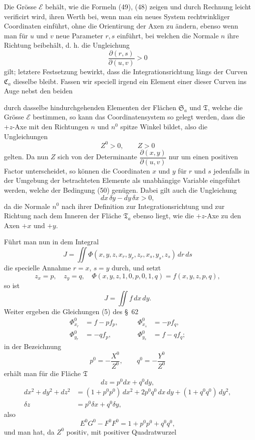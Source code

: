 \documentclass[11pt,a4paper,leqno]{article}
\begin{document}
Die Grösse $\mathcal{E}$ behält, wie die Formeln (49), (48) zeigen und durch
Rechnung leicht verificirt wird, ihren Werth bei, wenn man ein neues System
rechtwinkliger Coordinaten einführt, ohne die Orientirung der Axen zu
ändern, ebenso wenn man für $u$ und $v$ neue Parameter $r,s$ einführt, bei
welchen die Normale $n$ ihre Richtung beibehält, d. h. die Ungleichung
\begin{equation}\tag{50}
\frac{\partial(r,s)}{\partial(u,v)}>0
\end{equation}
gilt; letztere Festsetzung bewirkt, dass die Integrationsrichtung längs der
Curven $\mathfrak{C}_a$ dieselbe bleibt. Fassen wir speciell irgend ein
Element einer dieser Curven ins Auge nebst den beiden

durch dasselbe hindurchgehenden Elementen der Flächen $\mathfrak{S}_a$ und
$\mathfrak{T}$, welche die Grösse $\mathcal{E}$ bestimmen, so kann das
Coordinatensystem so gelegt werden, dass die $+z$-Axe mit den Richtungen $n$
und $n^0$ spitze Winkel bildet, also die Ungleichungen
\[
Z^0>0,\qquad Z>0
\]
gelten. Da nun $Z$ sich von der Determinante
$\dfrac{\partial(x,y)}{\partial(u,v)}$ nur um einen positiven Factor
unterscheidet, so können die Coordinaten $x$ und $y$ für $r$ und $s$
jedenfalls in der Umgebung der betrachteten Elemente als unabhängige
Variable eingeführt werden, welche der Bedingung (50) genügen. Dabei gilt
auch die Ungleichung
\begin{equation}\tag{51}
dx\,\delta y-dy\,\delta x>0,
\end{equation}
da die Normale $n^0$ nach ihrer Definition zur Integrationsrichtung und zur
Richtung nach dem Inneren der Fläche $\mathfrak{T}_a$ ebenso liegt, wie die
$+z$-Axe zu den Axen $+x$ und $+y$.

Führt man nun in dem Integral
\[
J=\iint\Phi(x,y,z,x_r,y_r,z_r,x_s,y_s,z_s)\,dr\,ds
\]
die specielle Annahme $r=x$, $s=y$ durch, und setzt
\[
z_x=p,\quad z_y=q,\quad
\Phi(x,y,z,1,0,p,0,1,q)=f(x,y,z,p,q),
\]
so ist
\[
J=\iint f\,dx\,dy.
\]
Weiter ergeben die Gleichungen (5) des \S~62
\[
\begin{aligned}
\Phi^0_{x_r}&=f-pf_p,&\qquad \Phi^0_{x_s}&=-pf_q,\\
\Phi^0_{y_r}&=-qf_p,&\qquad \Phi^0_{y_s}&=f-qf_q;
\end{aligned}
\]
in der Bezeichnung
\[
p^0=-\frac{X^0}{Z^0},\qquad q^0=-\frac{Y^0}{Z^0}
\]
erhält man für die Fläche $\mathfrak{T}$
\[
dz=p^0dx+q^0dy,
\]
\[
\begin{aligned}
dx^2+dy^2+dz^2
&=(1+p^0p^0)\,dx^2+2p^0q^0\,dx\,dy+(1+q^0q^0)\,dy^2,\\
\delta z&=p^0\delta x+q^0\delta y,
\end{aligned}
\]
also
\[
E^0G^0-F^0F^0=1+p^0p^0+q^0q^0,
\]
und man hat, da $Z^0$ positiv, mit positiver Quadratwurzel
\end{document}
